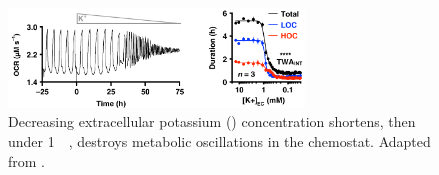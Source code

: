 \begin{figure}
  \centering
  \includegraphics[width=0.7\textwidth]{oneillEukaryoticCellBiology2020_4_adapted.png}
  \caption{
    Decreasing extracellular potassium () concentration shortens, then under \SI{1}{\milli\molar}, destroys metabolic oscillations in the chemostat.
    Adapted from \textcite{oneillEukaryoticCellBiology2020}.
  }
  \label{fig:biology-kdeficient-oneill}
\end{figure}


